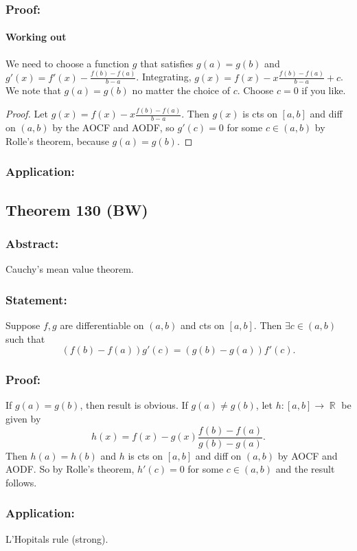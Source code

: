 \documentclass{article}
\DeclareMathOperator\R{\mathbb{R}}
\begin{document}
\subsubsection*{Proof:}
\paragraph{Working out}
We need to choose a function $g$ that satisfies $g(a) = g(b)$
and $g'(x) = f'(x)-\frac{f(b)-f(a)}{b-a}$. Integrating,
$g(x) = f(x) - x\frac{f(b)-f(a)}{b-a} +c$. We note that $g(a)=g(b)$ no matter the choice of $c$.
Choose $c=0$ if you like.
\begin{proof}
Let $g(x) = f(x) - x\frac{f(b)-f(a)}{b-a}$. Then $g(x)$ is cts on $[a,b]$ and diff
on $(a,b)$
by the AOCF and AODF, so $g'(c) = 0$ for some $c \in (a,b)$ by Rolle's theorem, because $g(a)=g(b)$.
\end{proof}
\subsubsection*{Application:}

\subsection{Theorem 130 (BW)}
\subsubsection*{Abstract:}
Cauchy's mean value theorem.
\subsubsection*{Statement:}
Suppose $f,g$ are differentiable on $(a,b)$ and cts on $[a,b]$. Then $\exists c \in (a,b)$ such that
\[
(f(b)-f(a))g'(c) = (g(b)-g(a))f'(c).
\]
\subsubsection*{Proof:}
If $g(a)=g(b)$, then result is obvious.
If $g(a) \neq g(b)$, let $h:[a,b] \to \R$ be given by \[
h(x) = f(x)-g(x)\frac{f(b)-f(a)}{g(b)-g(a)}.
\]
Then $h(a)=h(b)$ and $h$ is cts on $[a,b]$ and diff on $(a,b)$ by AOCF and AODF.
So by Rolle's theorem, $h'(c) = 0$ for some $c \in (a,b)$ and the result follows.
\subsubsection*{Application:}
L'Hopitals rule (strong).
\end{document}
